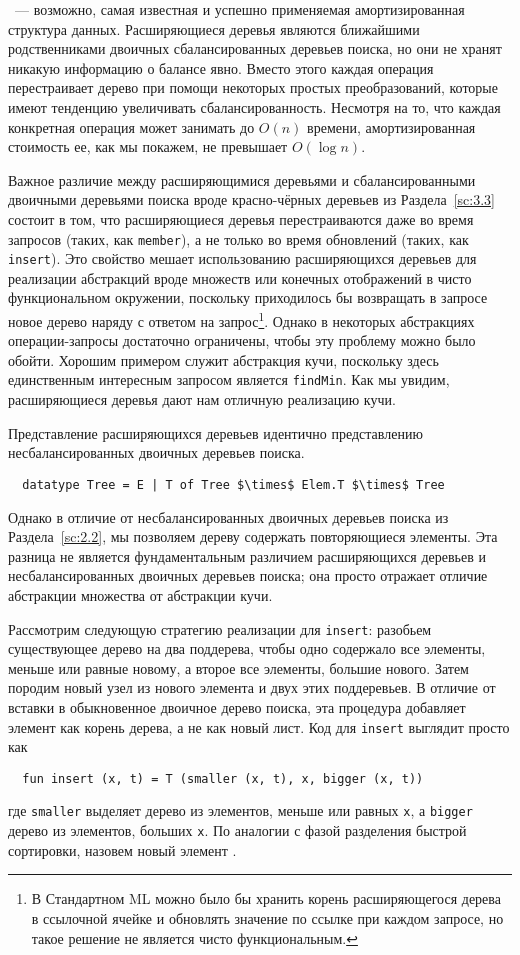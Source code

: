  \cite{SleatorTarjan1985}~--- возможно, самая известная
и успешно применяемая амортизированная структура данных. Расширяющиеся
деревья являются ближайшими родственниками двоичных сбалансированных
деревьев поиска, но они не хранят никакую информацию о балансе
явно. Вместо этого каждая операция перестраивает дерево при помощи
некоторых простых преобразований, которые имеют тенденцию увеличивать
сбалансированность. Несмотря на то, что каждая конкретная операция
может занимать до $O(n)$ времени, амортизированная стоимость ее, как
мы покажем, не превышает $O(\log n)$.

Важное различие между расширяющимися деревьями и сбалансированными
двоичными деревьями поиска вроде красно-чёрных деревьев из
Раздела~\ref{sc:3.3} состоит в том, что расширяющиеся деревья
перестраиваются даже во время запросов (таких, как \lstinline!member!),
а не только во время обновлений (таких, как \lstinline!insert!). Это
свойство мешает использованию расширяющихся деревьев для реализации
абстракций вроде множеств или конечных отображений в чисто
функциональном окружении, поскольку приходилось бы возвращать в
запросе новое дерево наряду с ответом на запрос\footnote{%
В Стандартном ML можно было бы хранить корень расширяющегося дерева в
ссылочной ячейке и обновлять значение по ссылке при каждом запросе, но
такое решение не является чисто функциональным.
}.
Однако в некоторых абстракциях операции-запросы достаточно ограничены,
чтобы эту проблему можно было обойти. Хорошим примером служит
абстракция кучи, поскольку здесь единственным интересным запросом
является \lstinline!findMin!. Как мы увидим, расширяющиеся деревья дают
нам отличную реализацию кучи.

Представление расширяющихся деревьев идентично представлению
несбалансированных двоичных деревьев поиска.
\begin{lstlisting}
  datatype Tree = E | T of Tree $\times$ Elem.T $\times$ Tree
\end{lstlisting}
Однако в отличие от несбалансированных двоичных деревьев поиска из
Раздела~\ref{sc:2.2}, мы позволяем дереву содержать повторяющиеся
элементы. Эта разница не является фундаментальным различием расширяющихся
деревьев и несбалансированных двоичных деревьев поиска; она просто
отражает отличие абстракции множества от абстракции кучи.

Рассмотрим следующую стратегию реализации для \lstinline!insert!:
разобьем существующее дерево на два поддерева, чтобы одно содержало все
элементы, меньше или равные новому, а второе все элементы, большие
нового. Затем породим новый узел из нового элемента и двух этих
поддеревьев. В отличие от вставки в обыкновенное двоичное дерево
поиска, эта процедура добавляет элемент как корень дерева, а не как
новый лист. Код для \lstinline!insert! выглядит просто как
\begin{lstlisting}
  fun insert (x, t) = T (smaller (x, t), x, bigger (x, t))
\end{lstlisting}
где \lstinline!smaller! выделяет дерево из элементов, меньше или равных
\lstinline!x!, а \lstinline!bigger! дерево из элементов, больших
\lstinline!x!. По аналогии с фазой разделения быстрой сортировки,
назовем новый элемент .


